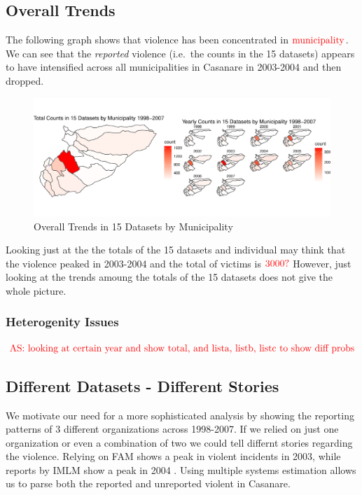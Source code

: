 \documentclass[]{article}
\begin{document}
\hypertarget{overall-trends}{%
\subsection{Overall Trends}\label{overall-trends}}

The following graph shows that violence has been concentrated in
\(\textcolor{red}{\text{municipality}}\). We can see that the
\emph{reported} violence (i.e.~the counts in the 15 datasets) appears to
have intensified across all municipalities in Casanare in 2003-2004 and
then dropped.

\begin{figure}
\centering
\includegraphics{Categorical-FinalProject_files/figure-latex/gisplots-1.pdf}
\caption{Overall Trends in 15 Datasets by Municipality}
\end{figure}

Looking just at the the totals of the 15 datasets and individual may
think that the violence peaked in 2003-2004 and the total of victims is
\(\textcolor{red}{\text{3000?}}\) However, just looking at the trends
amoung the totals of the 15 datasets does not give the whole picture.

\hypertarget{heterogenity-issues}{%
\subsubsection{Heterogenity Issues}\label{heterogenity-issues}}

\(\textcolor{red}{\text{AS: looking at certain year and show total, and lista, listb, listc to show diff probs}}\)

\hypertarget{different-datasets---different-stories}{%
\subsection{Different Datasets - Different
Stories}\label{different-datasets---different-stories}}

We motivate our need for a more sophisticated analysis by showing the
reporting patterns of 3 different organizations across 1998-2007. If we
relied on just one organization or even a combination of two we could
tell differnt stories regarding the violence. Relying on FAM shows a
peak in violent incidents in 2003, while reports by IMLM show a peak in
2004 . Using multiple systems estimation allows us to parse both the
reported and unreported violent in Casanare.
\end{document}
